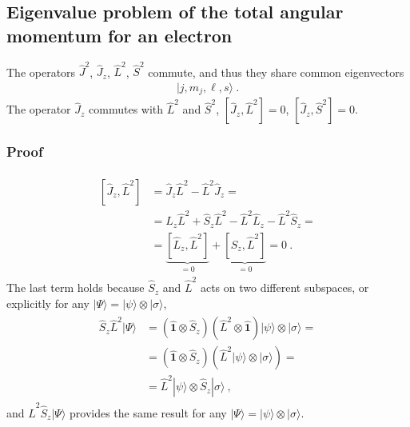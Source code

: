 \documentclass[letterpaper,10pt,english]{jupyterBook}
\begin{document}
\subsection{Eigenvalue problem of the total angular momentum for an electron}
\label{\detokenize{ch/quantum-mechanics/angular-momentum/angular-momentum-total:eigenvalue-problem-of-the-total-angular-momentum-for-an-electron}}
\sphinxAtStartPar
{} The operators \(\hat{J}^2\), \(\hat{J}_z\), \(\hat{L}^2\), \(\hat{S}^2\) commute, and thus they share common eigenvectors
\begin{equation*}
\begin{split}| j, m_j, \ell, s \rangle \ .\end{split}
\end{equation*}
\sphinxAtStartPar
The operator \(\hat{J}_z\) commutes with \(\hat{L}^2\) and \(\hat{S}^2\), \(\left[ \hat{J}_z, \hat{L}^2 \right] = 0\), \(\left[ \hat{J}_z, \hat{S}^2 \right] = 0\).
\subsubsection*{Proof}
\begin{equation*}
\begin{split}\begin{aligned}
  \left[ \hat{J}_z, \hat{L}^2 \right]
  & = \hat{J}_z \hat{L}^2 - \hat{L}^2 \hat{J}_z = \\
  & = \hat{L}_z \hat{L}^2 + \hat{S}_z \hat{L}^2 - \hat{L}^2 \hat{L}_z - \hat{L}^2 \hat{S}_z = \\
  & = \underbrace{\left[ \hat{L}_z,  \hat{L}^2 \right]}_{ = 0 } + \underbrace{\left[ \hat{S}_z, \hat{L}^2 \right]}_{ = 0} = 0 \ .
\end{aligned}\end{split}
\end{equation*}
\sphinxAtStartPar
The last term holds because \(\hat{S}_z\) and \(\hat{L}^2\) acts on two different sub\sphinxhyphen{}spaces, or explicitly for any \(| \Psi \rangle = | \psi \rangle \otimes | \sigma \rangle\),
\begin{equation*}
\begin{split}\begin{aligned}
  \hat{S}_z \hat{L}^2 | \Psi \rangle
  & = ( \hat{\mathbf{1}} \otimes \hat{S}_z ) ( \hat{L}^2 \otimes \hat{\mathbf{1}} ) | \psi \rangle \otimes | \sigma \rangle = \\ 
  & = ( \hat{\mathbf{1}} \otimes \hat{S}_z ) ( \hat{L}^2 | \psi \rangle \otimes | \sigma \rangle ) = \\ 
  & = \hat{L}^2 | \psi \rangle \otimes \hat{S}_z | \sigma \rangle \ ,
\end{aligned}\end{split}
\end{equation*}
\sphinxAtStartPar
and \(\hat{L}^2 \hat{S}_z | \Psi \rangle\) provides the same result for any \(| \Psi \rangle = | \psi \rangle \otimes | \sigma \rangle\).
\end{document}
